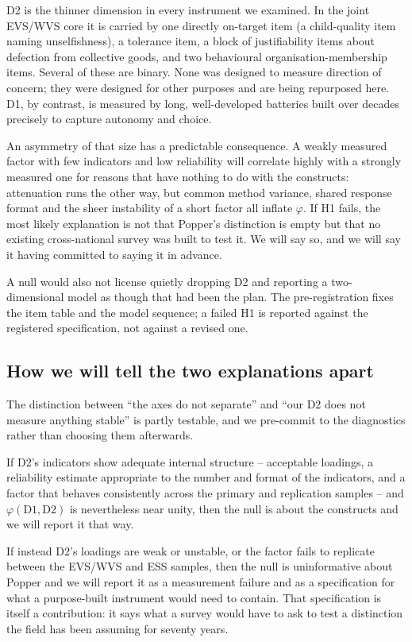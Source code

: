D2 is the thinner dimension in every instrument we examined. In the joint
EVS/WVS core it is carried by one directly on-target item (a child-quality
item naming unselfishness), a tolerance item, a block of justifiability items
about defection from collective goods, and two behavioural
organisation-membership items. Several of these are binary. None was designed
to measure direction of concern; they were designed for other purposes and are
being repurposed here. D1, by contrast, is measured by long, well-developed
batteries built over decades precisely to capture autonomy and choice.

An asymmetry of that size has a predictable consequence. A weakly measured
factor with few indicators and low reliability will correlate highly with a
strongly measured one for reasons that have nothing to do with the constructs:
attenuation runs the other way, but common method variance, shared response
format and the sheer instability of a short factor all inflate
$\varphi$. If H1 fails, the most likely explanation is not that Popper's
distinction is empty but that no existing cross-national survey was built to
test it. We will say so, and we will say it having committed to saying it in
advance.

A null would also not license quietly dropping D2 and reporting a
two-dimensional model as though that had been the plan. The pre-registration
fixes the item table and the model sequence; a failed H1 is reported against
the registered specification, not against a revised one.

\subsection{How we will tell the two explanations apart}

The distinction between ``the axes do not separate'' and ``our D2 does not
measure anything stable'' is partly testable, and we pre-commit to the
diagnostics rather than choosing them afterwards.

If D2's indicators show adequate internal structure -- acceptable loadings,
a reliability estimate appropriate to the number and format of the indicators,
and a factor that behaves consistently across the primary and replication
samples -- and $\varphi(\mathrm{D1}, \mathrm{D2})$ is nevertheless near unity,
then the null is about the constructs and we will report it that way.

If instead D2's loadings are weak or unstable, or the factor fails to replicate
between the EVS/WVS and ESS samples, then the null is uninformative about
Popper and we will report it as a measurement failure and as a specification
for what a purpose-built instrument would need to contain. That specification
is itself a contribution: it says what a survey would have to ask to test a
distinction the field has been assuming for seventy years.

